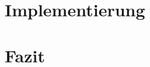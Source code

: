 \documentclass[12pt,a4paper,bibliography=totocnumbered,listof=totocnumbered]{scrartcl}
\begin{document}
\section{Implementierung}


%
%
%
%
%
%
%
%
%

\section{Fazit}

\newpage

\citet{*}


\pagebreak
\rhead{\rightmark}

\pagebreak




\end{document}
